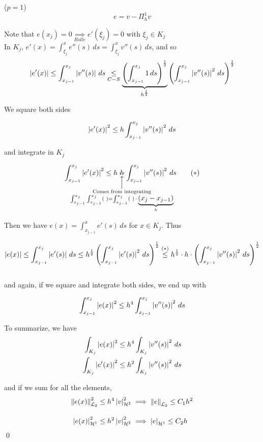\begin{demo}
  ($p=1$)\\
  \vspace{-0.5cm}
  $$e=v-\Pi_h^1v$$
  
  Note that $e(x_j) = 0 \underset{Rolle}{\implies} e'(\xi_j)=0$ with $\xi_j \in K_j$\\
  
  In $\displaystyle{K_j,\, e'(x) = \int_{\xi_j}^x e''(s)\,ds = \int_{\xi_j}^x v''(s)\,ds}$, and so
  \[
    \left\vert e'(x) \right\vert \leq \int_{x_{j-1}}^{x_j} \left\vert v''(s) \right\vert\,ds \underset{C-S}{\leq} \underbrace{\left(\int_{x_{j-1}}^{x_j}1\,ds\right)^{\frac{1}{2}}}_{h^{\frac{1}{2}}}\left(\int_{x_{j-1}}^{x_j} \left\vert v''(s) \right\vert^2 \, ds\right)^{\frac{1}{2}}
  \]
  
  We square both sides
  
  \[
    \left\vert e'(x) \right\vert^2 \leq h \int_{x_{j-1}}^{x_j} \left\vert v''(s) \right\vert^2 \, ds
  \]
  
  and integrate in $K_j$
  
  \[
    \int_{x_{j-1}}^{x_j}\abs{e'(x)}^2 \leq h\cdot \hspace{-2.6cm}\underset{\substack{\Big\uparrow \\ \text{Comes from integrating}\\\int_{x_{j-1}}^{x_j}\int_{x_{j-1}}^{x_j}(\,\,) = \int_{x_{j-1}}^{x_j}(\,\,)\,\cdot\,\underbrace{(x_j - x_{j-1})}_{h}}}{h}\hspace{-2.6cm}\cdot \int_{x_{j-1}}^{x_j} \abs{v''(s)}^2 \, ds \tag{$*$}
  \]
  
  Then we have $e(x) = \displaystyle{\int_{x_{j-1}}^x e'(s)\,ds}$ for $x\in K_j$. Thus
  
  \[
    \left\vert e(x) \right\vert \leq \int_{x_{j-1}}^{x_j}\left\vert e'(s) \right\vert\,ds \leq h^{\frac{1}{2}}\left(\int_{x_{j-1}}^{x_j}\left\vert e'(s) \right\vert^2\,ds\right)^{\frac{1}{2}} \overset{(*)}{\leq} h^{\frac{1}{2}}\cdot h \cdot \left(\int_{x_{j-1}}^{x_j}\left\vert v''(s) \right\vert^2\,ds\right)^{\frac{1}{2}}
  \]\-\\
  and again, if we square and integrate both sides, we end up with
  
  \[
    \int_{x_{j-1}}^{x_j}\left\vert e(x) \right\vert^2 \leq h^4\int_{x_{j-1}}^{x_j}\left\vert v''(s) \right\vert^2\,ds
  \]
  
  To summarize, we have
  \begin{align*}
      \int_{K_j}\left\vert e(x) \right\vert^2 &\leq h^4\int_{K_j}\left\vert v''(s) \right\vert^2\,ds\\
      \int_{K_j}\left\vert e'(x) \right\vert^2 &\leq h^2\int_{K_j}\left\vert v''(s) \right\vert^2\,ds
  \end{align*}
  
  and if we sum for all the elements,
  \begin{align*}
      \left\lVert e(x)\right\rVert_{\mathcal{L}_2}^2 &\leq h^4\left\vert v \right\vert_{\mathcal{H}^2}^2 \implies \left\lVert e\right\rVert_{\mathcal{L}_2} \leq C_1h^2\\[10pt]
      \left\vert e(x) \right\vert_{\mathcal{H}^1}^2 &\leq h^2\left\vert v \right\vert_{\mathcal{H}^2}^2 \implies \left\vert e \right\vert_{\mathcal{H}^1} \leq C_2h
  \end{align*}
  \qed
\end{demo}

